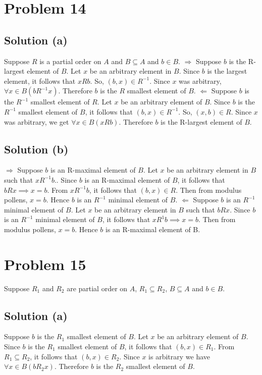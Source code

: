 \documentclass{article}
\begin{document}
\section{Problem 14}
\subsection{Solution (a)}
Suppose $R$ is a partial order on $A$ and $B \subseteq A$ and $b \in
B$.
$\Rightarrow$ Suppose $b$ is the R-largest element of $B$. Let $x$ be
an arbitrary element in $B$. Since $b$ is the largest element, it
follows that $xRb$. So, $(b,x) \in R^{-1}$. Since $x$ was arbitrary,
$\forall x \in B(b R^{-1} x)$. Therefore $b$ is the $R$ smallest
element of $B$.
$\Leftarrow$ Suppose $b$ is the $R^{-1}$ smallest element of $R$. Let
$x$ be an arbitrary element of $B$. Since $b$ is the $R^{-1}$ smallest
element of $B$, it follows that $(b,x) \in R^{-1}$. So, $(x,b) \in R$.
Since $x$ was arbitrary, we get $\forall x \in B(xRb)$. Therefore $b$
is the R-largest element of $B$.

\subsection{Solution (b)}
$\Rightarrow$ Suppose $b$ is an R-maximal element of $B$. Let $x$ be
an arbitrary element in $B$ such that $xR^{-1}b$.. Since $b$ is an
R-maximal element of $B$, it follows that $bRx \implies x = b$. From
$xR^{-1}b$, it follows that $(b,x) \in R$. Then from modulus pollens,
$x = b$. Hence $b$ is an $R^{-1}$ minimal element of $B$.
$\Leftarrow$ Suppose $b$ is an $R^{-1}$ minimal element of $B$. Let
$x$ be an arbitrary element in $B$ such that $bRx$. Since $b$ is an
$R^{-1}$ minimal element of $B$, it follows that $xR^{1}b \implies x =
b$. Then from modulus pollens, $x = b$. Hence $b$ is an R-maximal
element of B.

\section{Problem 15}
Suppose $R_1$ and $R_2$ are partial order on $A$, $R_1 \subseteq R_2$,
$B \subseteq A$ and $b \in B$.
\subsection{Solution (a)}
Suppose $b$ is the $R_1$ smallest element of $B$. Let $x$ be an
arbitrary element of $B$. Since $b$ is the $R_1$ smallest element of
$B$, it follows that $(b,x) \in R_1$. From $R_1 \subseteq R_2$, it
follows that $(b,x) \in R_2$. Since $x$ is arbitrary we have $\forall
x \in B(bR_2x)$. Therefore $b$ is the $R_2$ smallest element of $B$.
\end{document}
